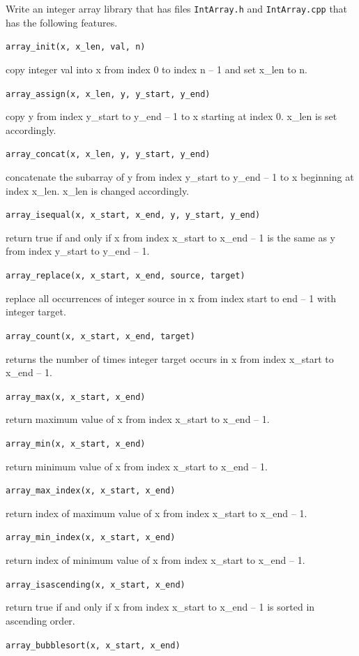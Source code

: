 Write an integer array library that has files \texttt{IntArray.h} and
\texttt{IntArray.cpp} that has the following features.

\texttt{array\_init(x, x\_len, val, n)}

copy integer val into x from index 0 to index n -- 1 and set x\_len to
n.

\texttt{array\_assign(x, x\_len, y, y\_start, y\_end)}

copy y from index y\_start to y\_end -- 1 to x starting at index 0.
x\_len is set accordingly.

\texttt{array\_concat(x, x\_len, y, y\_start, y\_end)}

concatenate the subarray of y from index y\_start to y\_end -- 1 to x
beginning at index x\_len. x\_len is changed accordingly.

\texttt{array\_isequal(x, x\_start, x\_end, y, y\_start, y\_end)}

return true if and only if x from index x\_start to x\_end -- 1 is the
same as y from index y\_start to y\_end -- 1.

\texttt{array\_replace(x, x\_start, x\_end, source, target)}

replace all occurrences of integer source in x from index start to end
-- 1 with integer target.

\texttt{array\_count(x, x\_start, x\_end, target)}

returns the number of times integer target occurs in x from index
x\_start to x\_end -- 1.

\texttt{array\_max(x, x\_start, x\_end)}

return maximum value of x from index x\_start to x\_end -- 1.

\texttt{array\_min(x, x\_start, x\_end)}

return minimum value of x from index x\_start to x\_end -- 1.

\texttt{array\_max\_index(x, x\_start, x\_end)}

return index of maximum value of x from index x\_start to x\_end -- 1.

\texttt{array\_min\_index(x, x\_start, x\_end)}

return index of minimum value of x from index x\_start to x\_end -- 1.

\texttt{array\_isascending(x, x\_start, x\_end)}

return true if and only if x from index x\_start to x\_end -- 1 is
sorted in ascending order.

\texttt{array\_bubblesort(x, x\_start, x\_end)}

